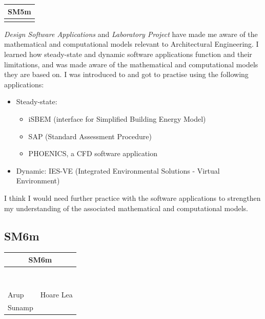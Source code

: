 \begin{table}
	\begin{tabular}{|ll|}
		\hline
		\multicolumn{2}{|c|}{\cellcolor[HTML]{F8A102}\textbf{SM5m \littlemaster}} \\ \hline
		\DSA & \LAB \\ \hline
	\end{tabular}
\end{table}

\textit{Design Software Applications} and \textit{Laboratory Project} have made me aware of the mathematical and computational models relevant to Architectural Engineering.
I learned how steady-state and dynamic software applications function and their limitations, and was made aware of the mathematical and computational models they are based on.
I was introduced to and got to practise using the following applications:
\begin{itemize}
    \item Steady-state:
    	\begin{itemize}
    		\item iSBEM (interface for Simplified Building Energy Model)
    		\item SAP (Standard Assessment Procedure)
    		\item PHOENICS, a CFD software application
    	\end{itemize}
    \item Dynamic: IES-VE (Integrated Environmental Solutions - Virtual Environment)
\end{itemize}

I think I would need further practice with the software applications to strengthen my understanding of the associated mathematical and computational models.







\subsection*{SM6m}

\begin{table}
	\begin{tabular}{|ll|}
		\hline
		\multicolumn{2}{|c|}{\cellcolor[HTML]{F8A102}\textbf{SM6m \nomaster}} \\ \hline
		\HBE & \ID \\
		\BST & \IE \\
		\DPA & \Acoustics \\
		\HYD & \EnvBeh \\
		\CAS & \EnBldgs \\
		\TPS & \DI \\
		\DST & \LAB \\
		\ISE & \ICP \\
		Arup & Hoare Lea \\
		Sunamp &  \\ \hline
	\end{tabular}
\end{table}

